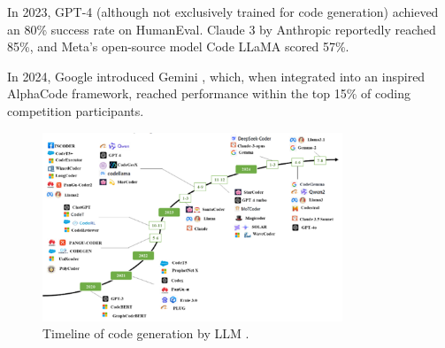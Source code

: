 In 2023, GPT-4 \cite{openai2023gpt4} (although not 
exclusively trained for code generation)  
achieved an 80\% success rate on HumanEval. 
Claude 3 by Anthropic reportedly reached 85\%, 
and Meta’s open-source model Code LLaMA 
\cite{roziere2023code} scored 57\%.

In 2024, Google introduced Gemini \cite{AlphaCode_2}, 
which, when integrated into an inspired AlphaCode framework, 
reached performance within the top 15\% of coding competition 
participants.



\begin{figure}[ht]
    \centering
    \includegraphics[width=0.8\textwidth]{img/CodeGenerator.png}
    \caption{Timeline of code generation by LLM \cite{wu2022research}.}
    \label{fig:LLM-coder-examples}
\end{figure}